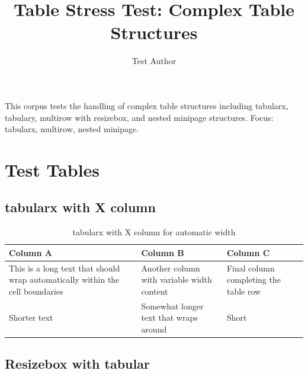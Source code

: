 \documentclass{article}
\title{Table Stress Test: Complex Table Structures}
\author{Test Author}
\begin{document}
\maketitle

\begin{abstrct}
This corpus tests the handling of complex table structures including tabularx,
tabulary, multirow with resizebox, and nested minipage structures.
Focus: tabularx, multirow, nested minipage.
\end{abstrct}

\section{Test Tables}

\subsection{tabularx with X column}

\begin{table}[ht]
\centering
\caption{tabularx with X column for automatic width}
\label{tab:tabularx}
\begin{tabularx}{\linewidth}{|X|X|X|}
\hline
\textbf{Column A} & \textbf{Column B} & \textbf{Column C} \\
\hline
This is a long text that should wrap automatically within the cell boundaries &
Another column with variable width content &
Final column completing the table row \\
\hline
Shorter text &
Somewhat longer text that wraps around &
Short \\
\hline
\end{tabularx}
\end{table}

\subsection{Resizebox with tabular}

\begin{table}[ht]
\centering
\caption{Table within resizebox}
\label{tab:resize}
\end{table}
\end{document}
